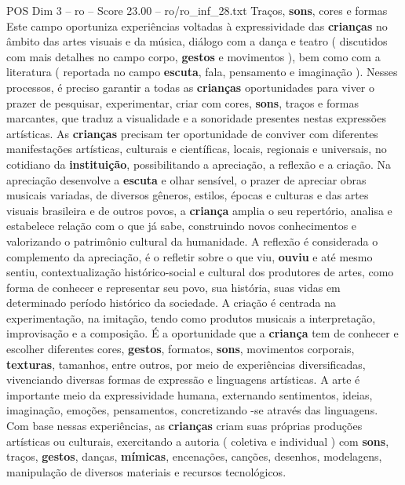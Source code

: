 \begin{textsample}{POS Dim 3 – ro – Score 23.00 – ro/ro\_inf\_28.txt}  \label{ex:f3_pos_138}
Traços, \textbf{sons}, cores e formas Este campo oportuniza experiências voltadas à expressividade das \textbf{crianças} no âmbito das artes visuais e da música, diálogo com a dança e teatro ( discutidos com mais detalhes no campo corpo, \textbf{gestos} e movimentos ), bem como com a literatura ( reportada no campo \textbf{escuta}, fala, pensamento e imaginação ).
Nesses processos, é preciso garantir a todas as \textbf{crianças} oportunidades para viver o prazer de pesquisar, experimentar, criar com cores, \textbf{sons}, traços e formas marcantes, que traduz a visualidade e a sonoridade presentes nestas expressões artísticas.
As \textbf{crianças} precisam ter oportunidade de conviver com diferentes manifestações artísticas, culturais e científicas, locais, regionais e universais, no cotidiano da \textbf{instituição}, possibilitando a apreciação, a reflexão e a criação.
Na apreciação desenvolve a \textbf{escuta} e olhar sensível, o prazer de apreciar obras musicais variadas, de diversos gêneros, estilos, épocas e culturas e das artes visuais brasileira e de outros povos, a \textbf{criança} amplia o seu repertório, analisa e estabelece relação com o que já sabe, construindo novos conhecimentos e valorizando o patrimônio cultural da humanidade.
A reflexão é considerada o complemento da apreciação, é o refletir sobre o que viu, \textbf{ouviu} e até mesmo sentiu, contextualização histórico-social e cultural dos produtores de artes, como forma de conhecer e representar seu povo, sua história, suas vidas em determinado período histórico da sociedade.
A criação é centrada na experimentação, na imitação, tendo como produtos musicais a interpretação, improvisação e a composição.
É a oportunidade que a \textbf{criança} tem de conhecer e escolher diferentes cores, \textbf{gestos}, formatos, \textbf{sons}, movimentos corporais, \textbf{texturas}, tamanhos, entre outros, por meio de experiências diversificadas, vivenciando diversas formas de expressão e linguagens artísticas.
A arte é importante meio da expressividade humana, externando sentimentos, ideias, imaginação, emoções, pensamentos, concretizando -se através das linguagens.
Com base nessas experiências, as \textbf{crianças} criam suas próprias produções artísticas ou culturais, exercitando a autoria ( coletiva e individual ) com \textbf{sons}, traços, \textbf{gestos}, danças, \textbf{mímicas}, encenações, canções, desenhos, modelagens, manipulação de diversos materiais e recursos tecnológicos.

\end{textsample}

